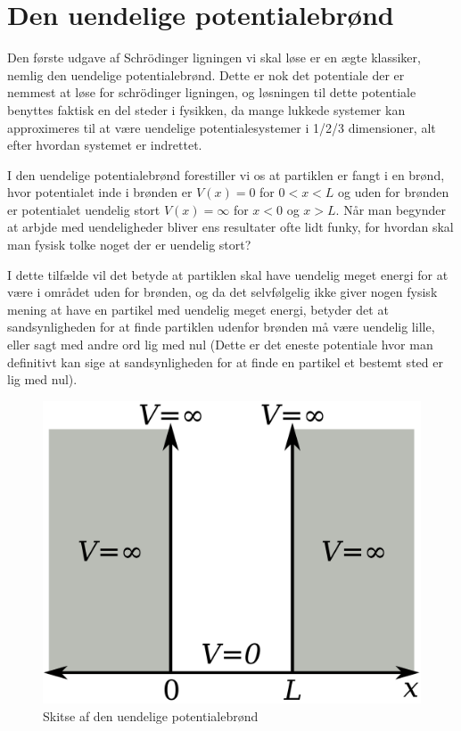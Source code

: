 
\section{Den uendelige potentialebrønd}
Den første udgave af Schrödinger ligningen vi skal løse er en ægte klassiker, nemlig den uendelige potentialebrønd. Dette er nok det potentiale der er nemmest at løse for schrödinger ligningen, og løsningen til dette potentiale benyttes faktisk en del steder i fysikken, da mange lukkede systemer kan approximeres til at være uendelige potentialesystemer i 1/2/3 dimensioner, alt efter hvordan systemet er indrettet.

I den uendelige potentialebrønd forestiller vi os at partiklen er fangt i en brønd, hvor potentialet inde i brønden er $V(x)=0$ for $0<x<L$ og uden for brønden er potentialet uendelig stort $V(x)=\infty$ for $x<0$ og $x>L$. Når man begynder at arbjde med uendeligheder bliver ens resultater ofte lidt funky, for hvordan skal man fysisk tolke noget der er uendelig stort?

I dette tilfælde vil det betyde at partiklen skal have uendelig meget energi for at være i området uden for brønden, og da det selvfølgelig ikke giver nogen fysisk mening at have en partikel med uendelig meget energi, betyder det at sandsynligheden for at finde partiklen udenfor brønden må være uendelig lille, eller sagt med andre ord lig med nul (Dette er det eneste potentiale hvor man definitivt kan sige at sandsynligheden for at finde en partikel et bestemt sted er lig med nul).
\begin{figure}[h]
    \centering
    \includegraphics[scale=0.13]{Kvantemekanik/billeder/uendelig.png}
    \caption{Skitse af den uendelige potentialebrønd}
    \label{fig:uendelig}
\end{figure}

